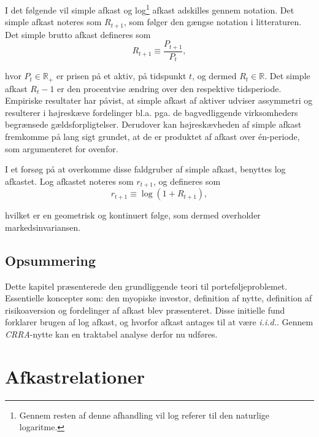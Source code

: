 \documentclass[
  a4paper,
  oneside]{memoir}
\begin{document}
I det følgende vil simple afkast og log\footnote{Gennem resten af denne afhandling vil log referer til den naturlige logaritme.} afkast adskilles gennem notation. Det simple afkast noteres som \(R_{t+1}\), som følger den gængse notation i litteraturen. Det simple brutto afkast defineres som
\[R_{t+1}\equiv\frac{P_{t+1}}{P_t},\]

hvor \(P_t\in\mathbb{R}_+\) er prisen på et aktiv, på tidspunkt \(t\), og dermed \(R_t\in\mathbb{R}\). Det simple afkast \(R_t-1\) er den procentvise ændring over den respektive tidsperiode. Empiriske resultater har påvist, at simple afkast af aktiver udviser assymmetri og resulterer i højreskæve fordelinger bl.a. pga. de bagvedliggende virksomheders begrænsede gældsforpligtelser. Derudover kan højreskævheden af simple afkast fremkomme på lang sigt grundet, at de er produktet af afkast over én-periode, som argumenteret for ovenfor.

I et forsøg på at overkomme disse faldgruber af simple afkast, benyttes log afkastet. Log afkastet noteres som \(r_{t+1}\), og defineres som
\[r_{t+1}\equiv\log(1+R_{t+1}),\]

hvilket er en geometrisk og kontinuert følge, som dermed overholder markedsinvariansen.

\hypertarget{opsunteo}{%
\section{Opsummering}\label{opsunteo}}

Dette kapitel præsenterede den grundliggende teori til porteføljeproblemet. Essentielle koncepter som: den myopiske investor, definition af nytte, definition af risikoaversion og fordelinger af afkast blev præsenteret. Disse initielle fund forklarer brugen af log afkast, og hvorfor afkast antages til at være \emph{i.i.d.}. Gennem \emph{CRRA}-nytte kan en traktabel analyse derfor nu udføres.

\hypertarget{afkrel}{%
\chapter{Afkastrelationer}\label{afkrel}}
\end{document}
